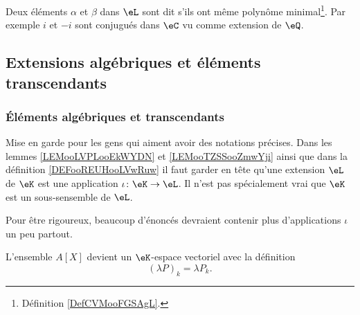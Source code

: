 \begin{definition}		\label{DEFooJQQYooMKqWov}
	Deux éléments \( \alpha\) et \( \beta\) dans \( \eL\) sont dit  s'ils ont même polynôme minimal\footnote{Définition \ref{DefCVMooFGSAgL}.}. Par exemple \( i\) et \( -i\) sont conjugués dans \( \eC\) vu comme extension de \( \eQ\).
\end{definition}

\subsection{Extensions algébriques et éléments transcendants}

\subsubsection{Éléments algébriques et transcendants}

\begin{normaltext}
	Mise en garde pour les gens qui aiment avoir des notations précises. Dans les lemmes \ref{LEMooLVPLooEkWYDN} et \ref{LEMooTZSSooZmwYji} ainsi que dans la définition \ref{DEFooREUHooLVwRuw} il faut garder en tête qu'une extension \( \eL\) de \(\eK\) est une application \(\iota \colon \eK\to \eL  \). Il n'est pas spécialement vrai que \( \eK\) est un sous-sensemble de \( \eL\).

	Pour être rigoureux, beaucoup d'énoncés devraient contenir plus d'applications \( \iota\) un peu partout.
\end{normaltext}


\begin{definition}      \label{DEFooBBYGooWoOloR}
	L'ensemble \( A[X]\) devient un \( \eK\)-espace vectoriel avec la définition
	\begin{equation}
		(\lambda P)_k=\lambda P_k.
	\end{equation}
\end{definition}

